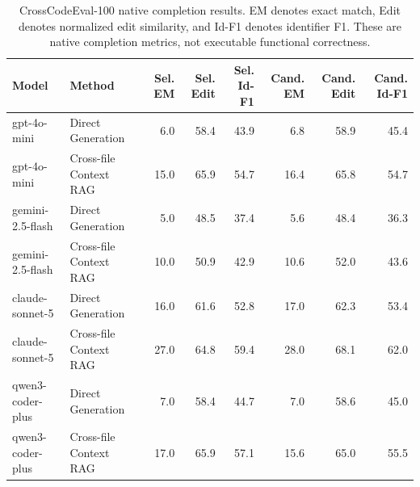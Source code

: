 \begin{table}[t]
\centering
\small
\caption{CrossCodeEval-100 native completion results. EM denotes exact match, Edit denotes normalized edit similarity, and Id-F1 denotes identifier F1. These are native completion metrics, not executable functional correctness.}
\label{tab:crosscodeeval100}
\begin{tabular}{llrrrrrr}
\toprule
Model & Method & Sel. EM & Sel. Edit & Sel. Id-F1 & Cand. EM & Cand. Edit & Cand. Id-F1 \\
\midrule
gpt-4o-mini & Direct Generation & 6.0 & 58.4 & 43.9 & 6.8 & 58.9 & 45.4 \\
gpt-4o-mini & Cross-file Context RAG & 15.0 & 65.9 & 54.7 & 16.4 & 65.8 & 54.7 \\
\midrule
gemini-2.5-flash & Direct Generation & 5.0 & 48.5 & 37.4 & 5.6 & 48.4 & 36.3 \\
gemini-2.5-flash & Cross-file Context RAG & 10.0 & 50.9 & 42.9 & 10.6 & 52.0 & 43.6 \\
\midrule
claude-sonnet-5 & Direct Generation & 16.0 & 61.6 & 52.8 & 17.0 & 62.3 & 53.4 \\
claude-sonnet-5 & Cross-file Context RAG & 27.0 & 64.8 & 59.4 & 28.0 & 68.1 & 62.0 \\
\midrule
qwen3-coder-plus & Direct Generation & 7.0 & 58.4 & 44.7 & 7.0 & 58.6 & 45.0 \\
qwen3-coder-plus & Cross-file Context RAG & 17.0 & 65.9 & 57.1 & 15.6 & 65.0 & 55.5 \\
\bottomrule
\end{tabular}
\end{table}
